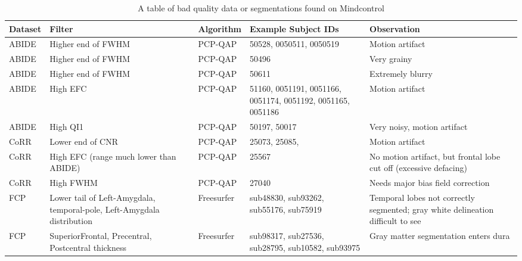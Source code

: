 \begin{table}
\begin{tabular}{ | l | p{3cm} | l | p{3cm} | p{4cm} | }

\hline
	\textbf{Dataset} & \textbf{Filter} & \textbf{Algorithm} & \textbf{Example Subject IDs} & \textbf{Observation} \\ \hline
	ABIDE & Higher end of FWHM & PCP-QAP & 50528, 0050511, 0050519 & Motion artifact \\ \hline
	ABIDE & Higher end of FWHM & PCP-QAP & 50496 & Very grainy \\ \hline
	ABIDE & Higher end of FWHM & PCP-QAP & 50611 & Extremely blurry \\ \hline
	ABIDE & High EFC & PCP-QAP & 51160, 0051191, 0051166, 0051174, 0051192, 0051165, 0051186 & Motion artifact \\ \hline
	ABIDE & High QI1 & PCP-QAP & 50197, 50017 & Very noisy, motion artifact \\ \hline
	CoRR & Lower end of CNR & PCP-QAP & 25073, 25085, & Motion artifact \\ \hline
	CoRR & High EFC (range much lower than ABIDE) & PCP-QAP & 25567 & No motion artifact, but frontal lobe cut off (excessive defacing) \\ \hline
	CoRR & High FWHM & PCP-QAP & 27040 & Needs major bias field correction \\ \hline
	FCP & Lower tail of Left-Amygdala, temporal-pole, Left-Amygdala distribution & Freesurfer & sub48830, sub93262, sub55176, sub75919 & Temporal lobes not correctly segmented; gray white delineation difficult to see \\ \hline
	FCP & SuperiorFrontal, Precentral, Postcentral thickness & Freesurfer & sub98317, sub27536, sub28795, sub10582, sub93975 & Gray matter segmentation enters dura \\ \hline



\end{tabular}
\label{tab:examples}
\caption{A table of bad quality data or segmentations found on Mindcontrol}

\end{table}
